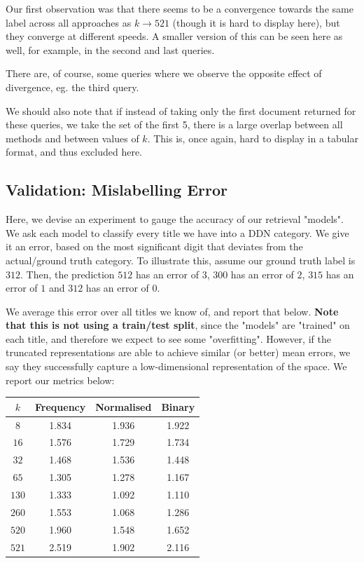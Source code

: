 \documentclass[article]{article}
\begin{document}
Our first observation was that there seems to be a convergence towards the same label across all approaches as $k \rightarrow 521$ (though it is hard to display here), but they converge at different speeds. A smaller version of this can be seen here as well, for example, in the second and last queries.

There are, of course, some queries where we observe the opposite effect of divergence, eg. the third query.\bigskip

We should also note that if instead of taking only the first document returned for these queries, we take the set of the first 5, there is a large overlap between all methods and between values of $k$. This is, once again, hard to display in a tabular format, and thus excluded here.

\subsection{Validation: Mislabelling Error}
Here, we devise an experiment to gauge the accuracy of our retrieval "models". We ask each model to classify every title we have into a DDN category. We give it an error, based on the most significant digit that deviates from the actual/ground truth category. To illustrate this, assume our ground truth label is $312$. Then, the prediction $512$ has an error of $3$, $300$ has an error of $2$, $315$ has an error of $1$ and $312$ has an error of $0$.\bigskip

We average this error over all titles we know of, and report that below. \textbf{Note that this is not using a train/test split}, since the "models" are "trained" on each title, and therefore we expect to see some "overfitting". However, if the truncated representations are able to achieve similar (or better) mean errors, we say they successfully capture a low-dimensional representation of the space. We report our metrics below:\bigskip

\begin{center}
    \begin{tabular}{|*{4}{c|}}
    \hline $k$ & Frequency & Normalised & Binary\\
    \hline $8$ & 1.834 & 1.936 & 1.922\\
    \hline $16$ & 1.576 & 1.729 & 1.734\\
    \hline $32$ & 1.468 & 1.536 & 1.448\\
    \hline $65$ & 1.305 & 1.278 & 1.167\\
    \hline $130$ & 1.333 & 1.092 & 1.110\\
    \hline $260$ & 1.553 & 1.068 & 1.286\\
    \hline $520$ & 1.960 & 1.548 & 1.652\\
    \hline $521$ & 2.519 & 1.902 & 2.116\\
    \hline
    \end{tabular}
\end{center}
\end{document}

